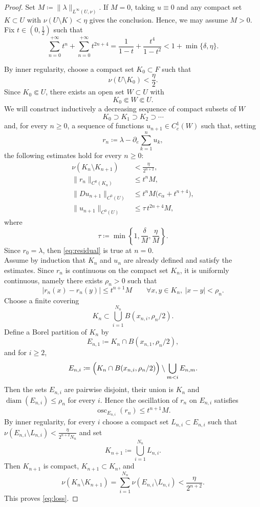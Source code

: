 \documentclass[10pt,a4paper]{amsart}
\newcommand{\diam}{\operatorname{diam}}
\newcommand{\osc}{\operatorname{osc}}
\begin{document}
\begin{proof}
 Set $M \coloneqq \|\lambda\|_{L^\infty(U,\nu)}$.
If $M=0$, taking $u\equiv 0$ and any compact set $K\subset U$ with $\nu(U\setminus K)<\eta$ gives the conclusion.
Hence, we may assume $M>0$.
Fix $t\in \left(0,\frac{1}{2}\right)$ such that
\begin{equation}\label{eq:t_geom_piccola}
    \sum_{n=0}^{+\infty}t^n + \sum_{n=0}^{+\infty}t^{2n+4} =\frac{1}{1-t} + \frac{t^4}{1-t^2}< 1+\min\{\delta,\eta\}.
\end{equation}

By inner regularity, choose a compact set $K_0\subset F$ such that
$$
\nu(U\setminus K_0)<\frac{\eta}{2}.
$$
Since $K_0\Subset U$, there exists an open set $W\subset U$ with
$$
K_0\Subset W\Subset U.
$$
We will construct inductively a decreasing sequence of compact subsets of $W$
$$
K_0\supset K_1\supset K_2\supset\cdots
$$
and, for every $n\geq 0$, a sequence of functions $u_{n+1}\in C^1_c(W)$
such that, setting
$$
r_n\coloneqq \lambda-\partial_e \sum_{k=1}^n u_k,
$$
the following estimates hold for every $n\ge 0$:
\begin{align}
\nu(K_n\setminus K_{n+1}) &< \frac{\eta}{2^{n+2}}, \label{eq:loss}\\
\|r_n\|_{C^0(K_n)} &\le t^n M, \label{eq:residual}\\
\|Du_{n+1}\|_{C^0(U)} &\le t^n M\bigl(c_\alpha+t^{n+4}\bigr), \label{eq:gradstep}\\
\|u_{n+1}\|_{C^0(U)} &\le \tau\,t^{2n+4}M, \label{eq:supstep}
\end{align}
where
$$
\tau\coloneqq \min\left\{1,\frac{\delta}{M}, \frac{\eta}{M}\right\}.
$$
Since $r_0=\lambda$, then \eqref{eq:residual} is true at $n=0$.\\

Assume by induction that $K_n$ and $u_n$ are already defined and satisfy the estimates.
Since $r_n$ is continuous on the compact set $K_n$, it is uniformly continuous, namely there exists $\rho_n>0$ such that
$$
|r_n(x)-r_n(y)|\le t^{n+1}M
\qquad\forall x,y\in K_n,\ |x-y|<\rho_n.
$$
Choose a finite covering
$$
K_n\subset \bigcup_{i=1}^{N_n} B(x_{n,i},\rho_n/2).
$$
Define a Borel partition of $K_n$ by
$$
E_{n,1}\coloneqq K_n\cap B(x_{n,1},\rho_n/2),
$$
and for $i\ge 2$,
$$
E_{n,i}\coloneqq \Bigl(K_n\cap B(x_{n,i},\rho_n/2)\Bigr)\setminus \bigcup_{m<i}E_{n,m}.
$$
Then the sets $E_{n,i}$ are pairwise disjoint, their union is $K_n$ and $\diam(E_{n,i})\leq \rho_n$ for every $i$.
Hence the oscillation of $r_n$ on $E_{n,i}$ satisfies
$$
\osc_{E_{n,i}}(r_n)\le t^{n+1}M.
$$
By inner regularity, for every $i$ choose a compact set $L_{n,i}\subset E_{n,i}$ such that $\nu(E_{n,i}\setminus L_{n,i})<\frac{\eta}{2^{n+2}N_n}$ and set
$$
K_{n+1}\coloneqq \bigcup_{i=1}^{N_n}L_{n,i}.
$$
Then $K_{n+1}$ is compact, $K_{n+1}\subset K_n$, and
$$
\nu(K_n\setminus K_{n+1})
=\sum_{i=1}^{N_n}\nu(E_{n,i}\setminus L_{n,i})
< \frac{\eta}{2^{n+2}}.
$$
This proves \eqref{eq:loss}.


\end{proof}
\end{document}
